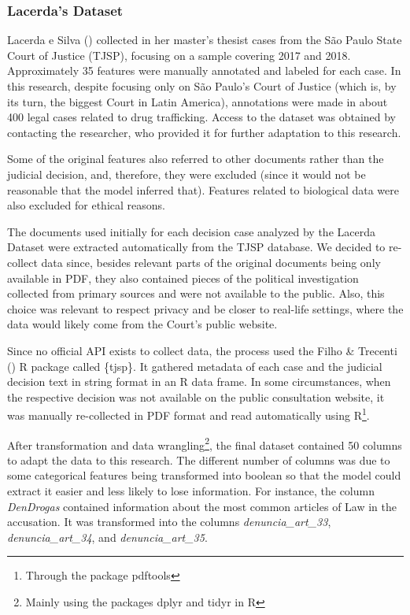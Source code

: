 \documentclass[
  12pt,
]{article}
\begin{document}
\subsubsection{Lacerda's Dataset}\label{lacerdas-dataset}

Lacerda e Silva ()
collected in her master's thesist cases from the São Paulo State Court
of Justice (TJSP), focusing on a sample covering 2017 and 2018.
Approximately 35 features were manually annotated and labeled for each
case. In this research, despite focusing only on São Paulo's Court of
Justice (which is, by its turn, the biggest Court in Latin America),
annotations were made in about 400 legal cases related to drug
trafficking. Access to the dataset was obtained by contacting the
researcher, who provided it for further adaptation to this research.

Some of the original features also referred to other documents rather
than the judicial decision, and, therefore, they were excluded (since it
would not be reasonable that the model inferred that). Features related
to biological data were also excluded for ethical reasons.

The documents used initially for each decision case analyzed by the
Lacerda Dataset were extracted automatically from the TJSP database. We
decided to re-collect data since, besides relevant parts of the original
documents being only available in PDF, they also contained pieces of the
political investigation collected from primary sources and were not
available to the public. Also, this choice was relevant to respect
privacy and be closer to real-life settings, where the data would likely
come from the Court's public website.

Since no official API exists to collect data, the process used the Filho
\& Trecenti () R package called
\{tjsp\}. It gathered metadata of each case and the judicial decision
text in string format in an R data frame. In some circumstances, when
the respective decision was not available on the public consultation
website, it was manually re-collected in PDF format and read
automatically using R\footnote{Through the package pdftools}.

After transformation and data wrangling\footnote{Mainly using the
  packages dplyr and tidyr in R}, the final dataset contained 50 columns
to adapt the data to this research. The different number of columns was
due to some categorical features being transformed into boolean so that
the model could extract it easier and less likely to lose information.
For instance, the column \emph{DenDrogas} contained information about
the most common articles of Law in the accusation. It was transformed
into the columns \emph{denuncia\_art\_33}, \emph{denuncia\_art\_34}, and
\emph{denuncia\_art\_35}.
\end{document}
